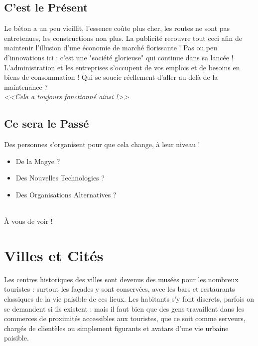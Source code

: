 \documentclass[11pt,twoside,a5paper]{book}
\begin{document}

	\subsection{C'est le Pr{\'e}sent}
	
	Le b{\'e}ton a un peu vieillit, l'essence co{\^u}te plus cher, les routes ne sont pas entretenues, les constructions non plus. La publicit{\'e} recouvre tout ceci afin de maintenir l'illusion d'une {\'e}conomie de march{\'e} florissante ! Pas ou peu d'innovations ici : c'est une "soci{\'e}t{\'e} glorieuse" qui continue dans sa lanc{\'e}e ! L'administration et les entreprises s'occupent de vos emplois et de besoins en biens de consommation ! Qui se soucie r{\'e}ellement d'aller au-del{\`a} de la maintenance ?~\\
	\emph{<<Cela a toujours fonctionn{\'e} ainsi !>>}

	\subsection{Ce sera le Pass{\'e}}
	
	Des personnes s'organisent pour que cela change, {\`a} leur niveau !~\\
	
	\begin{itemize}
		\item[$\bigstar$] De la Magye ?
		\item[$\bigstar$] Des Nouvelles Technologies ?
		\item[$\bigstar$] Des Organisations Alternatives ?
	\end{itemize}~\\
	
	{\`A} vous de voir !


\section{Villes et Cités}

Les centres historiques des villes sont devenus des musées pour les nombreux touristes : surtout les façades y sont conservées, avec les bars et restaurants classiques de la vie paisible de ces lieux. Les habitants s'y font discrets, parfois on se demandent si ils existent : mais il faut bien que des gens travaillent dans les commerces de proximités accessibles aux touristes, que ce soit comme serveurs, chargés de clientèles ou simplement figurants et avatars d'une vie urbaine paisible.~\\
\end{document}
